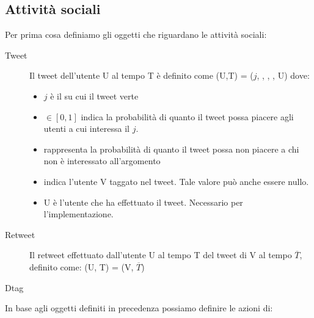 \subsection{Attivit\`a sociali}
\label{subsec:social}

Per prima cosa definiamo gli oggetti che riguardano le attivit\`a 
sociali:

\begin{description}
  \item[Tweet] Il tweet dell'utente U al tempo T \`e definito come
  \twt{}(U,T) = ($j$, \lika{}, \disla{}, \dtag, U) dove:
  \begin{itemize}
    \item $j$ \`e il \topic{} su cui il tweet verte
    \item \lika{} $\in [0,1]$ indica la probabilit\`a di quanto
    il tweet possa piacere agli utenti a cui interessa il 
    \topic{} $j$. 
    \item \disla{} rappresenta la probabilit\`a di quanto il tweet 
    possa non piacere a chi non \`e interessato all'argomento
    \item \dtag{} indica l'utente V taggato nel tweet. Tale valore 
    pu\`o anche essere nullo.
    \item U \`e l'utente che ha effettuato il tweet. 
    Necessario per l'implementazione.
  \end{itemize}
  
  \item[Retweet] Il retweet effettuato dall'utente U al tempo T
  del tweet di V al tempo $\overline{T}$, definito come:
  \retwt{}(U, T) = \twt{}(V, $\overline{T}$)
  
  \item[Dtag]
\end{description}

In base agli oggetti definiti in precedenza possiamo definire le 
azioni di:

